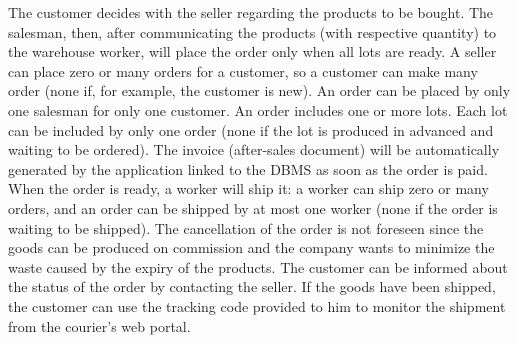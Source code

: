 The customer decides with the seller regarding the products to be bought. The salesman, then, after communicating the products (with respective quantity) to the warehouse worker, will place the order only when all lots are ready. A seller can place zero or many orders for a customer, so a customer can make many order (none if, for example, the customer is new). An order can be placed by only one salesman for only one customer. An order includes one or more lots. Each lot can be included by only one order (none if the lot is produced in advanced and waiting to be ordered). The invoice (after-sales document) will be automatically generated by the application linked to the DBMS as soon as the order is paid.
When the order is ready, a worker will ship it: a worker can ship zero or many orders, and an order can be shipped by at most one worker (none if the order is waiting to be shipped). The cancellation of the order is not foreseen since the goods can be produced on commission and the company wants to minimize the waste caused by the expiry of the products. The customer can be informed about the status of the order by contacting the seller. If the goods have been shipped, the customer can use the tracking code provided to him to monitor the shipment from the courier's web portal.
